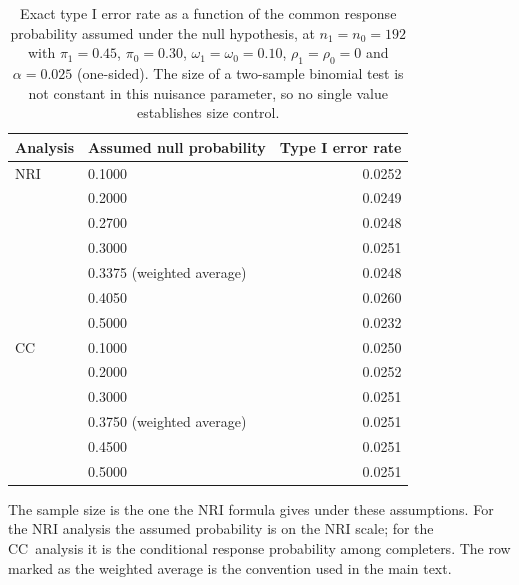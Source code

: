 \begin{table}[htbp]
  \centering
  \caption{Exact type I error rate as a function of the common response probability assumed under the null hypothesis, at $n_{1} = n_{0} = 192$ with $\pi_{1} = 0.45$, $\pi_{0} = 0.30$, $\omega_{1} = \omega_{0} = 0.10$, $\rho_{1} = \rho_{0} = 0$ and $\alpha = 0.025$ (one-sided). The size of a two-sample binomial test is not constant in this nuisance parameter, so no single value establishes size control.}
  \label{tab:null-prevalence}
  \begin{threeparttable}
  \begin{tabular}{llr}
    \toprule
    Analysis & Assumed null probability & Type I error rate \\
    \midrule
    NRI & 0.1000 & 0.0252 \\
     & 0.2000 & 0.0249 \\
     & 0.2700 & 0.0248 \\
     & 0.3000 & 0.0251 \\
     & 0.3375 (weighted average) & 0.0248 \\
     & 0.4050 & 0.0260 \\
     & 0.5000 & 0.0232 \\
    \addlinespace
    CC & 0.1000 & 0.0250 \\
     & 0.2000 & 0.0252 \\
     & 0.3000 & 0.0251 \\
     & 0.3750 (weighted average) & 0.0251 \\
     & 0.4500 & 0.0251 \\
     & 0.5000 & 0.0251 \\
    \bottomrule
  \end{tabular}
  \begin{tablenotes}[flushleft]\footnotesize
    \item The sample size is the one the NRI formula gives under these assumptions. For the NRI analysis the assumed probability is on the NRI scale; for the CC~analysis it is the conditional response probability among completers. The row marked as the weighted average is the convention used in the main text.
  \end{tablenotes}
  \end{threeparttable}
\end{table}
